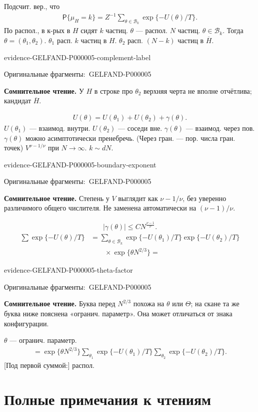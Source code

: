 \documentclass[11pt]{article}
\newcommand{\EvidenceBlock}[4]{%
 \par\smallskip\noindent\begin{minipage}{\linewidth}
 \begin{minipage}[t]{.47\linewidth}\vspace{0pt}\centering
 \csname evidence-#1-#2\endcsname\par
 {\scriptsize\SourceCropCaption\ #1}\par
 \end{minipage}\hfill
 \begin{minipage}[t]{.49\linewidth}\vspace{0pt}\raggedright
 {\small\color{orange!65!black}\textbf{#4} #3}\par
 \end{minipage}
 \end{minipage}\par\smallskip}
\newcommand{\Unclear}[3]{\EvidenceBlock{#1}{#2}{#3}{\ReadingCaption}}
\newcommand{\SourceCropCaption}{Оригинальные фрагменты:}\newcommand{\ReadingCaption}{Сомнительное чтение.}\newcommand{\IncompleteCaption}{Неразобранный фрагмент.}\newcommand{\DiagramCaption}{Рисунок и набранное описание.}
\begin{document}
Подсчит. вер., что
\begin{gather*}
 \mathsf{P}\{\mu_H=k\}=Z^{-1}
 \sum_{\theta\in\mathcal{B}_k}\exp\{-U(\theta)/T\}.
\end{gather*}
По распол., в к-рых в $H$ сидят $k$ частиц.
$\theta$ — распол. $N$ частиц.
$\theta\in\mathcal{B}_k$.
Тогда $\theta=(\theta_1,\theta_2)$.
$\theta_1$ расп. $k$ частиц в $H$.
$\theta_2$ расп. $(N-k)$ частиц в $\overline H$.
\Unclear{GELFAND-P000005}{complement-label}{У $H$ в строке про $\theta_2$ верхняя черта не вполне отчётлива; кандидат $\overline H$.}
\begin{gather*}
 U(\theta)=U(\theta_1)+U(\theta_2)+\gamma(\theta).
\end{gather*}
$U(\theta_1)$ — взаимод. внутри.
$U(\theta_2)$ — соседи вне.
$\gamma(\theta)$ — взаимод. через пов.
$\gamma(\theta)$ можно асимптотически пренебречь.
(Через гран. — пор. числа гран. точек)
$V^{\nu-1/\nu}$ при $N\to\infty$.
$k\sim dN$.
\Unclear{GELFAND-P000005}{boundary-exponent}{Степень у $V$ выглядит как $\nu-1/\nu$, без уверенно различимого общего числителя. Не заменена автоматически на $(\nu-1)/\nu$.}
\begin{gather*}
 |\gamma(\theta)|\le CN^{\frac{\nu-1}{\nu}}.
\end{gather*}
\begin{align*}
 \sum\exp\{-U(\theta)/T\}
 &=\sum_{\theta\in\mathcal{B}_k}\exp\{-U(\theta_1)/T\}
 \exp\{-U(\theta_2)/T\}\\
 &\qquad\times
 \exp\{\theta N^{2/3}\}
 =
\end{align*}
\Unclear{GELFAND-P000005}{theta-factor}{Буква перед $N^{2/3}$ похожа на $\theta$ или $\Theta$; на скане та же буква ниже пояснена «огранич. параметр». Она может отличаться от знака конфигурации.}
$\theta$ — огранич. параметр.
\begin{gather*}
 =\exp\{\theta N^{2/3}\}
 \sum_{\theta_1}\exp\{-U(\theta_1)/T\}
 \sum_{\theta_2}\exp\{-U(\theta_2)/T\}.
\end{gather*}
[Под первой суммой:] распол.


\clearpage\section*{Полные примечания к чтениям}
\end{document}
